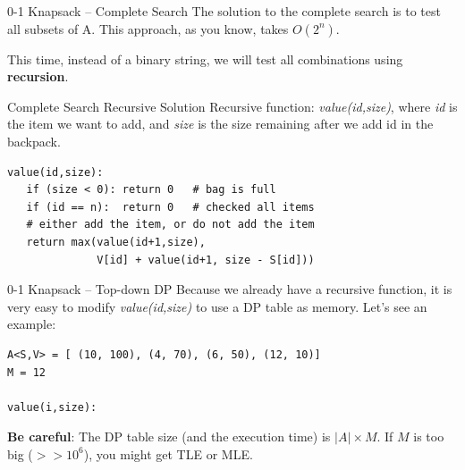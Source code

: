 \begin{frame}[fragile]{0-1 Knapsack -- Complete Search}
  The solution to the complete search is to test all subsets of A. This approach, as you know, takes $O(2^n)$.\bigskip

  This time, instead of a binary string, we will test all combinations using {\bf recursion}.

  \begin{block}{Complete Search Recursive Solution}
    Recursive function: \emph{value(id,size)}, where \emph{id} is the item we want to add, and \emph{size} is the size remaining after we add id in the backpack.\medskip

\begin{verbatim}
value(id,size):
   if (size < 0): return 0   # bag is full
   if (id == n):  return 0   # checked all items
   # either add the item, or do not add the item
   return max(value(id+1,size),
              V[id] + value(id+1, size - S[id]))
\end{verbatim}
  \end{block}
\end{frame}

\begin{frame}[fragile]{0-1 Knapsack -- Top-down DP}
  Because we already have a recursive function, it is very easy to modify \emph{value(id,size)} to use a DP table as memory. Let's see an example:

\begin{verbatim}
A<S,V> = [ (10, 100), (4, 70), (6, 50), (12, 10)]
M = 12

value(i,size):
\end{verbatim}

  \begin{center}
  \bigskip
  \end{center}

  {\bf Be careful}: The DP table size (and the execution time) is $|A|\times M$. If $M$ is too big ($>> 10^6$), you might get TLE or MLE.
\end{frame}

